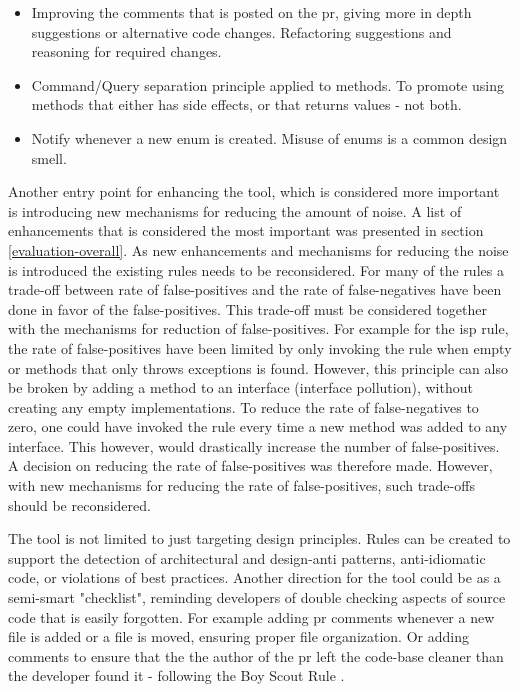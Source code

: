 \documentclass{report}
\begin{document}
\begin{itemize}
    \item Improving the comments that is posted on the \gls{pr}, giving more in depth suggestions or alternative code changes. Refactoring suggestions and reasoning for required changes.  
    
    \item Command/Query separation principle applied to methods. To promote using methods that either has side effects, or that returns values - not both. 
    
    \item Notify whenever a new enum is created. Misuse of enums is a common design smell.
\end{itemize}


Another entry point for enhancing the tool, which is considered more important is introducing new mechanisms for reducing the amount of noise. A list of enhancements that is considered the most important was presented in section \ref{evaluation-overall}. As new enhancements and mechanisms for reducing the noise is introduced the existing rules needs to be reconsidered. For many of the rules a trade-off between rate of false-positives and the rate of false-negatives have been done in favor of the false-positives. This trade-off must be considered together with the mechanisms for reduction of false-positives. For example for the \gls{isp} rule, the rate of false-positives have been limited by only invoking the rule when empty or methods that only throws exceptions is found. However, this principle can also be broken by adding a method to an interface (interface pollution), without creating any empty implementations. To reduce the rate of false-negatives to zero, one could have invoked the rule every time a new method was added to any interface. This however, would drastically increase the number of false-positives. A decision on reducing the rate of false-positives was therefore made. However, with new mechanisms for reducing the rate of false-positives, such trade-offs should be reconsidered. 

The tool is not limited to just targeting design principles. Rules can be created to support the detection of architectural and design-anti patterns, anti-idiomatic code, or violations of best practices. Another direction for the tool could be as a semi-smart "checklist", reminding developers of double checking aspects of source code that is easily forgotten. For example adding \gls{pr} comments whenever a new file is added or a file is moved, ensuring proper file organization. Or adding comments to ensure that the the author of the \gls{pr} left the code-base cleaner than the developer found it - following the Boy Scout Rule \cite{boy-scout}.
\end{document}
